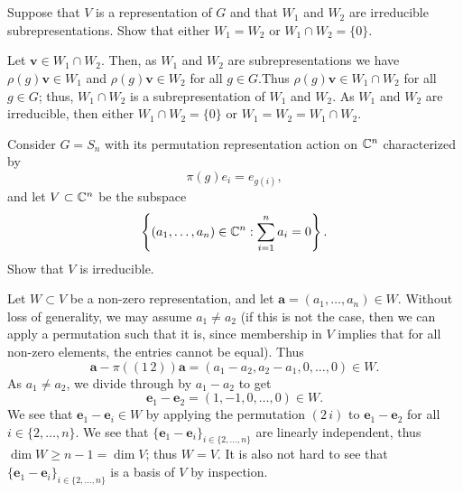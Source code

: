 \section{}

\question Suppose that $V$ is a representation of $G$ and that $W_1$ and $W_2$ are irreducible subrepresentations. Show that either $W_1 = W_2$ or $W_1 \cap W_2 = \{0\}$.
\begin{solution}
    Let $\bm v \in W_1 \cap W_2$. Then, as $W_1$ and $W_2$ are subrepresentations we have $\rho(g)\bm v \in W_1$ and $\rho(g)\bm v \in W_2$ for all $g \in G$.Thus $\rho(g)\bm v \in W_1 \cap W_2$ for all $g \in G$; thus, $W_1 \cap W_2$ is a subrepresentation of $W_1$ and $W_2$. As $W_1$ and $W_2$ are irreducible, then either $W_1 \cap W_2 = \{0\}$ or $W_1 = W_2 = W_1 \cap W_2$.
\end{solution}

\question Consider $G = S_n$ with its permutation representation action on $\mathbb C^n$ characterized by
\[ \pi(g)e_i = e_{g(i)}, \]
and let $V \subset \mathbb C^n$ be the subspace
\[ \left\{(a_1, \ldots, a_n) \in \mathbb C^n: \sum_{i=1}^n a_i = 0\right\}. \]
Show that $V$ is irreducible.
\begin{solution}
    Let $W \subset V$ be a non-zero representation, and let $\bm a = (a_1, \ldots, a_n) \in W$. Without loss of generality, we may assume $a_1 \neq a_2$ (if this is not the case, then we can apply a permutation such that it is, since membership in $V$ implies that for all non-zero elements, the entries cannot be equal). Thus
    \[ \bm a - \pi((1\,2))\bm a = (a_1 - a_2, a_2 - a_1, 0, \ldots, 0) \in W. \]
    As $a_1 \neq a_2$, we divide through by $a_1 - a_2$ to get
    \[ \bm e_1 - \bm e_2 = (1, -1, 0, \ldots, 0) \in W. \]
    We see that $\bm e_1 - \bm e_i \in W$ by applying the permutation $(2\,i)$ to $\bm e_1 - \bm e_2$ for all $i \in \{2, \ldots, n\}$. We see that $\{\bm e_1 - \bm e_i\}_{i \in \{2,\ldots, n\}}$ are linearly independent, thus $\dim W \geq n - 1 = \dim V$; thus $W = V$. It is also not hard to see that $\{\bm e_1 - \bm e_i\}_{i \in \{2,\ldots, n\}}$ is a basis of $V$ by inspection.
\end{solution}

